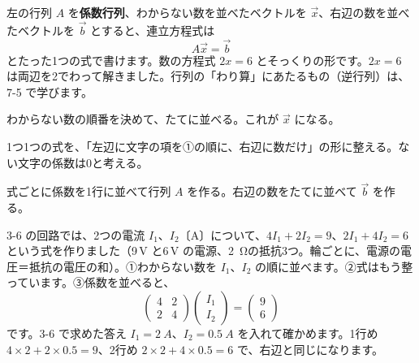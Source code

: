 \begin{bkcenter}
\end{bkcenter}

左の行列 $A$ を\textbf{係数行列}、わからない数を並べたベクトルを $\vec x$、右辺の数を並べたベクトルを $\vec b$ とすると、連立方程式は
\[ A\vec x=\vec b \]
とたった1つの式で書けます。数の方程式 $2x=6$ とそっくりの形です。$2x=6$ は両辺を2でわって解きました。行列の「わり算」にあたるもの（逆行列）は、7-5 で学びます。

\begin{enumerate}[label={\bkcircled[\bkTF]{\arabic*}}, leftmargin=2.4\zw, itemsep=2pt, topsep=2pt]
\item わからない数の順番を決めて、たてに並べる。これが $\vec x$ になる。
\item 1つ1つの式を、「左辺に文字の項を①の順に、右辺に数だけ」の形に整える。ない文字の係数は0と考える。
\item 式ごとに係数を1行に並べて行列 $A$ を作る。右辺の数をたてに並べて $\vec b$ を作る。
\end{enumerate}

3-6 の回路では、2つの電流 $I_1$、$I_2$〔A〕について、$4I_1+2I_2=9$、$2I_1+4I_2=6$ という式を作りました（9\,V と6\,V の電源、\qty{2}{\ohm}の抵抗3つ。輪ごとに、電源の電圧＝抵抗の電圧の和）。①わからない数を $I_1$、$I_2$ の順に並べます。②式はもう整っています。③係数を並べると、
\[ \begin{pmatrix} 4 & 2\\ 2 & 4 \end{pmatrix}\begin{pmatrix} I_1\\ I_2 \end{pmatrix}=\begin{pmatrix} 9\\ 6 \end{pmatrix} \]
です。3-6 で求めた答え $I_1=\qty{2}{A}$、$I_2=\qty{0.5}{A}$ を入れて確かめます。1行め $4\times2+2\times0.5=9$、2行め $2\times2+4\times0.5=6$ で、右辺と同じになります。

